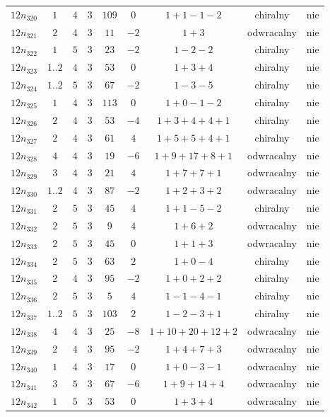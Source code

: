 \begin{longtable}{ccccccccc}
$12n_{320}$ & $1$ & $4$ & $3$ & $109$ & $0$ & $1+1-1-2$ & chiralny & nie \\
$12n_{321}$ & $2$ & $4$ & $3$ & $11$ & $-2$ & $1+3$ & odwracalny & nie \\
$12n_{322}$ & $1$ & $5$ & $3$ & $23$ & $-2$ & $1-2-2$ & chiralny & nie \\
$12n_{323}$ & $1..2$ & $4$ & $3$ & $53$ & $0$ & $1+3+4$ & chiralny & nie \\
$12n_{324}$ & $1..2$ & $5$ & $3$ & $67$ & $-2$ & $1-3-5$ & chiralny & nie \\
$12n_{325}$ & $1$ & $4$ & $3$ & $113$ & $0$ & $1+0-1-2$ & chiralny & nie \\
$12n_{326}$ & $2$ & $4$ & $3$ & $53$ & $-4$ & $1+3+4+4+1$ & chiralny & nie \\
$12n_{327}$ & $2$ & $4$ & $3$ & $61$ & $4$ & $1+5+5+4+1$ & chiralny & nie \\
$12n_{328}$ & $4$ & $4$ & $3$ & $19$ & $-6$ & $1+9+17+8+1$ & odwracalny & nie \\
$12n_{329}$ & $3$ & $4$ & $3$ & $21$ & $4$ & $1+7+7+1$ & odwracalny & nie \\
$12n_{330}$ & $1..2$ & $4$ & $3$ & $87$ & $-2$ & $1+2+3+2$ & odwracalny & nie \\
$12n_{331}$ & $2$ & $5$ & $3$ & $45$ & $4$ & $1+1-5-2$ & chiralny & nie \\
$12n_{332}$ & $2$ & $5$ & $3$ & $9$ & $4$ & $1+6+2$ & odwracalny & nie \\
$12n_{333}$ & $2$ & $5$ & $3$ & $45$ & $0$ & $1+1+3$ & odwracalny & nie \\
$12n_{334}$ & $2$ & $5$ & $3$ & $63$ & $2$ & $1+0-4$ & chiralny & nie \\
$12n_{335}$ & $2$ & $4$ & $3$ & $95$ & $-2$ & $1+0+2+2$ & chiralny & nie \\
$12n_{336}$ & $2$ & $5$ & $3$ & $5$ & $4$ & $1-1-4-1$ & chiralny & nie \\
$12n_{337}$ & $1..2$ & $5$ & $3$ & $103$ & $2$ & $1-2-3+1$ & chiralny & nie \\
$12n_{338}$ & $4$ & $4$ & $3$ & $25$ & $-8$ & $1+10+20+12+2$ & odwracalny & nie \\
$12n_{339}$ & $2$ & $4$ & $3$ & $95$ & $-2$ & $1+4+7+3$ & odwracalny & nie \\
$12n_{340}$ & $1$ & $4$ & $3$ & $17$ & $0$ & $1+0-3-1$ & odwracalny & nie \\
$12n_{341}$ & $3$ & $5$ & $3$ & $67$ & $-6$ & $1+9+14+4$ & odwracalny & nie \\
$12n_{342}$ & $1$ & $5$ & $3$ & $53$ & $0$ & $1+3+4$ & odwracalny & nie \\

\end{longtable}
